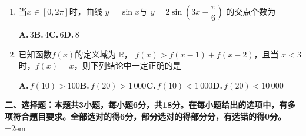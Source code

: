 \documentclass[UTF8,a4paper]{ctexart}
\begin{document}
\begin{enumerate}[series=s0, leftmargin=2em, itemsep=0.8em]
\noindent\textbf{A.}\,$(-\infty,0]$\quad\textbf{B.}\,$[-1,0]$\quad\textbf{C.}\,$[-1,1]$\quad\textbf{D.}\,$[0,+\infty)$
\par\smallskip





\item
当$x\in[0,2\pi]$时，曲线 $y=\sin x$与 $y=2\sin\left(3x-\dfrac{\pi}{6}\right)$ 的交点个数为


\noindent\textbf{A.}\,$3$\quad\textbf{B.}\,$4$\quad\textbf{C.}\,$6$\quad\textbf{D.}\,$8$
\par\smallskip





\item
已知函数$f(x)$的定义域为 $\mathbb R$， $f(x)>f(x-1)+f(x-2)$，且当 $x<3$时，$f(x)=x$，则下列结论中一定正确的是


\noindent\textbf{A.}\,$f(10)>100$\quad\textbf{B.}\,$f(20)>1\,000$\quad\textbf{C.}\,$f(10)<1\,000$\quad\textbf{D.}\,$f(20)<10\,000$
\par\smallskip




\end{enumerate}
\vspace{1em}



\noindent\textbf{二、选择题：本题共3小题，每小题6分，共18分。在每小题给出的选项中，有多项符合题目要求。全部选对的得6分，部分选对的得部分分，有选错的得0分。}\hangindent=2em
\par\medskip
\end{document}
